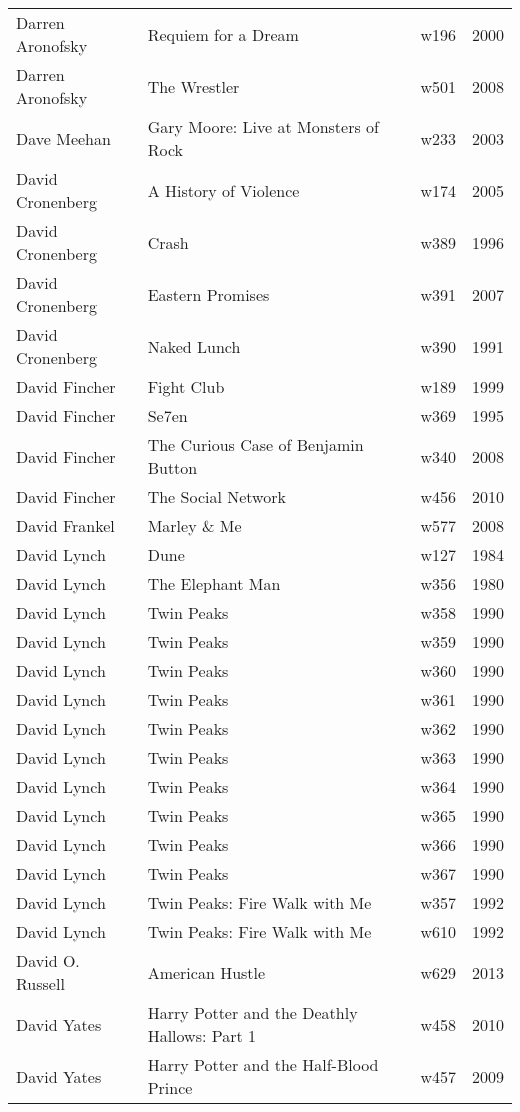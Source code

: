 \documentclass{article}
\begin{document}
\begin {center}
\begin{longtable}{l p{10cm} l l}
Darren Aronofsky & Requiem for a Dream & w196 & 2000 \\
Darren Aronofsky & The Wrestler & w501 & 2008 \\
Dave Meehan & Gary Moore: Live at Monsters of Rock & w233 & 2003 \\
David Cronenberg & A History of Violence & w174 & 2005 \\
David Cronenberg & Crash & w389 & 1996 \\
David Cronenberg & Eastern Promises & w391 & 2007 \\
David Cronenberg & Naked Lunch & w390 & 1991 \\
David Fincher & Fight Club & w189 & 1999 \\
David Fincher & Se7en & w369 & 1995 \\
David Fincher & The Curious Case of Benjamin Button & w340 & 2008 \\
David Fincher & The Social Network & w456 & 2010 \\
David Frankel & Marley \& Me & w577 & 2008 \\
David Lynch & Dune & w127 & 1984 \\
David Lynch & The Elephant Man & w356 & 1980 \\
David Lynch & Twin Peaks & w358 & 1990 \\
David Lynch & Twin Peaks & w359 & 1990 \\
David Lynch & Twin Peaks & w360 & 1990 \\
David Lynch & Twin Peaks & w361 & 1990 \\
David Lynch & Twin Peaks & w362 & 1990 \\
David Lynch & Twin Peaks & w363 & 1990 \\
David Lynch & Twin Peaks & w364 & 1990 \\
David Lynch & Twin Peaks & w365 & 1990 \\
David Lynch & Twin Peaks & w366 & 1990 \\
David Lynch & Twin Peaks & w367 & 1990 \\
David Lynch & Twin Peaks: Fire Walk with Me & w357 & 1992 \\
David Lynch & Twin Peaks: Fire Walk with Me & w610 & 1992 \\
David O. Russell & American Hustle & w629 & 2013 \\
David Yates & Harry Potter and the Deathly Hallows: Part 1 & w458 & 2010 \\
David Yates & Harry Potter and the Half-Blood Prince & w457 & 2009 \\

\end{longtable}
\end{center}
\end{document}
